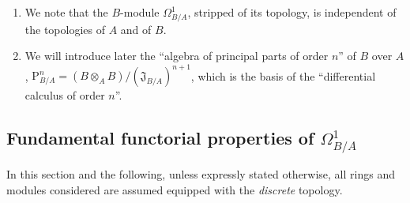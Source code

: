\begin{remarks}[20.4.14]
\label{0.20.4.14}
\begin{enumerate}
  \item[\rm(i)] We note that the $B$-module $\Omega^1_{B/A}$, stripped of its topology, is independent of the topologies of $A$ and of $B$.
  \item[\rm(ii)] We will introduce later the ``algebra of principal parts of order $n$'' of $B$ over $A$, $\mathrm{P}^n_{B/A}=(B\otimes_A B)/(\mathfrak{J}_{B/A})^{n+1}$, which is the basis of the ``differential calculus of order $n$''.
\end{enumerate}
\end{remarks}

\subsection{Fundamental functorial properties of \texorpdfstring{$\Omega^1_{B/A}$}{Ω¹(B/A)}}
\label{subsection:0.20.5}

\begin{env}[20.5.1]
\label{0.20.5.1}
In this section and the following, unless expressly stated otherwise, all rings and modules considered are assumed equipped with the \emph{discrete} topology.
\end{env}

